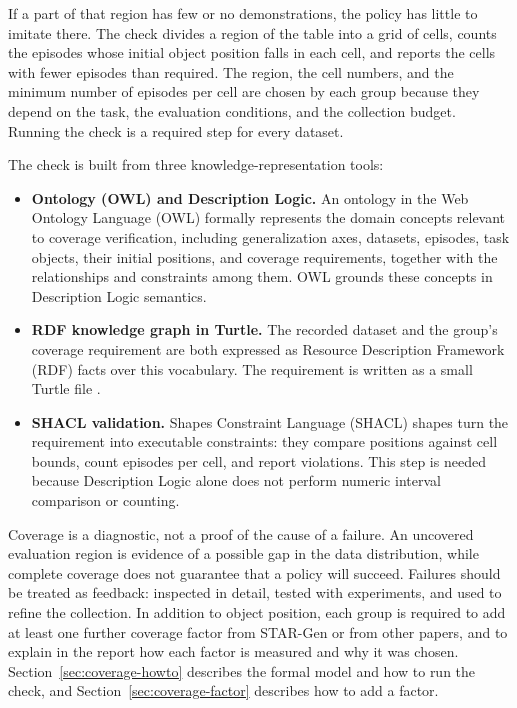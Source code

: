 \documentclass[11pt]{article}
\begin{document}
If a part of that region has few or no demonstrations, the policy has little to imitate there. The check divides a region of the table into a grid of cells, counts the episodes whose initial object position falls in each
cell, and reports the cells with fewer episodes than required. The region, the cell numbers, and the minimum number of
episodes per cell are chosen by each group because they depend on the task, the evaluation conditions, and the
collection budget. Running the check is a required step for every dataset.

The check is built from three knowledge-representation tools:

\begin{itemize}
  \item \textbf{Ontology (OWL) and Description Logic.} An ontology in the Web Ontology Language (OWL) formally represents the domain concepts relevant
        to coverage verification, including generalization axes, datasets, episodes, task objects, their initial
        positions, and coverage requirements, together with the relationships and constraints among them. OWL grounds these concepts in
        Description Logic semantics.
  \item \textbf{RDF knowledge graph in Turtle.} The recorded dataset and the group's coverage requirement are both
        expressed as Resource Description Framework (RDF) facts over this vocabulary. The requirement is written as a small Turtle file \cite{w3cTurtle}.
  \item \textbf{SHACL validation.} Shapes Constraint Language (SHACL) shapes \cite{w3cShacl} turn the requirement into executable constraints: they
        compare positions against cell bounds, count episodes per cell, and report violations. This step is needed
        because Description Logic alone does not perform numeric interval comparison or counting.
\end{itemize}

Coverage is a diagnostic, not a proof of the cause of a failure. An uncovered evaluation region is evidence of a
possible gap in the data distribution, while complete coverage does not guarantee that a policy will succeed. Failures
should be treated as feedback: inspected in detail, tested with experiments, and used to refine the collection. In
addition to object position, each group is required to add at least one further coverage factor from STAR-Gen or from other papers, and to explain in the report how each factor is measured and why it was chosen. Section~\ref{sec:coverage-howto} describes the formal model and how to run the check, and Section~\ref{sec:coverage-factor} describes how to add a factor.
\end{document}
